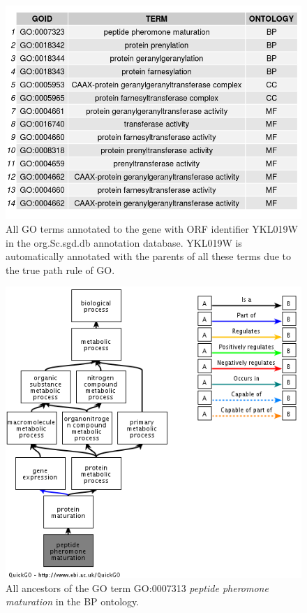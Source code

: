 \documentclass{beamer}
\begin{document}
	\begin{frame}
		
		\begin{figure}
			\centering
			\includegraphics[scale=0.4]{go_terms_YKL019W.png}
			\caption{All GO terms annotated to the gene with ORF identifier YKL019W in the org.Sc.sgd.db annotation database. YKL019W is automatically annotated with the parents of all these terms due to the true path rule of GO.}
			\label{all_go_YKL019W}
		\end{figure}
		
	\end{frame}
	
	\begin{frame}
		\begin{figure}
			\centering
			\includegraphics[scale=0.4]{GO:0007323.png}
			\caption{All ancestors of the GO term GO:0007313 \textit{peptide pheromone maturation} in the BP ontology.}
		\end{figure}
	\end{frame}
	
\end{document}
